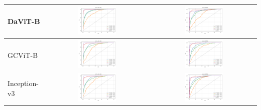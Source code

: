 \begin{table}[!htbp]
\begin{tabular}{|l|c|c|}
        DaViT-B & \includegraphics[width=0.38\textwidth]{figs/auc_roc/davit_base-msft_in1k_auc_roc_cross_entropy.png} & \includegraphics[width=0.38\textwidth]{figs/auc_roc/davit_base-msft_in1k_auc_roc_corn.png} \\ \hline
        GCViT-B & \includegraphics[width=0.38\textwidth]{figs/auc_roc/gcvit_base-in1k_auc_roc_cross_entropy.png} & \includegraphics[width=0.38\textwidth]{figs/auc_roc/gcvit_base-in1k_auc_roc_corn.png} \\ \hline
        Inception-v3 & \includegraphics[width=0.38\textwidth]{figs/auc_roc/inception_v3_auc_roc_cross_entropy.png} & \includegraphics[width=0.38\textwidth]{figs/auc_roc/inception_v3_auc_roc_corn.png} \\ \hline
    \end{tabular}
\end{table}

